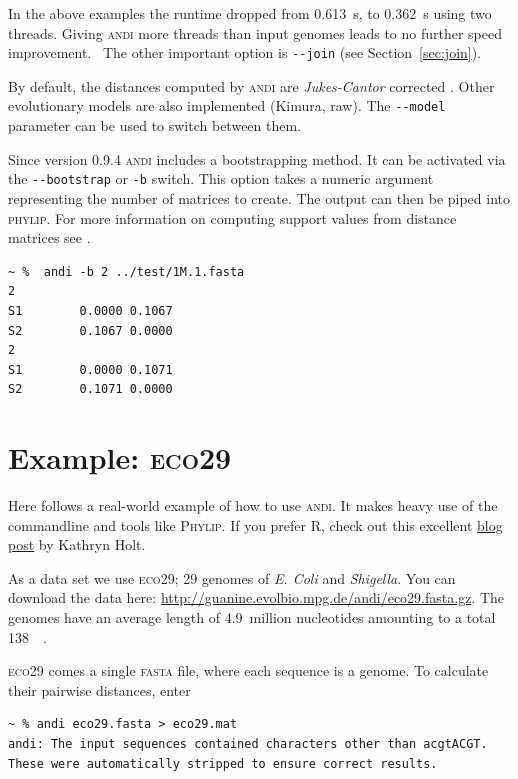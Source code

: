 \documentclass[a4paper,
  10pt,
  english,
  DIV=12,
  BCOR=8mm]{scrbook}
\newcommand{\algo}[1]{\textsc{{#1}}}
\newcommand{\andi}{\algo{andi}\xspace}
\begin{document}
In the above examples the runtime dropped from \SI{0.613}{\second}, to \SI{0.362}{\second} using two threads. Giving \andi more threads than input genomes leads to no further speed improvement. \, The other important option is \lstinline$--join$ (see Section~\ref{sec:join}).

By default, the distances computed by \andi are \emph{Jukes-Cantor} corrected \cite{jukescantor}. Other evolutionary models are also implemented (Kimura, raw). The \lstinline$--model$ parameter can be used to switch between them.

Since version 0.9.4 \andi includes a bootstrapping method. It can be activated via the \lstinline$--bootstrap$ or \lstinline$-b$ switch. This option takes a numeric argument representing the number of matrices to create. The output can then be piped into \algo{phylip}. For more information on computing support values from distance matrices see \cite{afra}.

\begin{lstlisting}
~ %  andi -b 2 ../test/1M.1.fasta
2
S1        0.0000 0.1067
S2        0.1067 0.0000
2
S1        0.0000 0.1071
S2        0.1071 0.0000
\end{lstlisting}

\section{Example: \algo{eco29}}

Here follows a real-world example of how to use \algo{andi}. It makes heavy use of the commandline and tools like \algo{Phylip}. If you prefer \algo{R}, check out this excellent \href{http://holtlab.net/2015/05/08/r-code-to-infer-tree-from-andi-output/}{blog post} by Kathryn Holt.

As a data set we use \algo{eco29}; 29 genomes of \textit{E. Coli} and \textit{Shigella}. You can download the data here: {\small{\url{http://guanine.evolbio.mpg.de/andi/eco29.fasta.gz}}}. The genomes have an average length of 4.9~million nucleotides amounting to a total \SI{138}{\mega\byte}.

\algo{eco29} comes a single \algo{fasta} file, where each sequence is a genome. To calculate their pairwise distances, enter

\begin{lstlisting}
~ % andi eco29.fasta > eco29.mat
andi: The input sequences contained characters other than acgtACGT. These were automatically stripped to ensure correct results.
\end{lstlisting}
\end{document}
